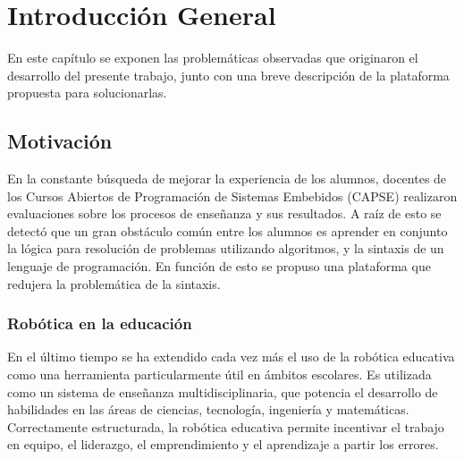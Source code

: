 
\chapter{Introducción General} %

\label{Chapter1} %
\label{IntroGeneral}

\newcommand{\keyword}[1]{\textbf{#1}}
\newcommand{\tabhead}[1]{\textbf{#1}}
\newcommand{\code}[1]{\texttt{#1}}
\newcommand{\file}[1]{\texttt{\bfseries#1}}
\newcommand{\option}[1]{\texttt{\itshape#1}}
\newcommand{\grados}{$^{\circ}$}



En este capítulo se exponen las problemáticas observadas que originaron el desarrollo del presente trabajo, junto con una breve descripción de la plataforma propuesta para solucionarlas.
\section{Motivación}
\label{sec:motivacion}
En la constante búsqueda de mejorar la experiencia de los alumnos, docentes de los Cursos Abiertos de Programación de Sistemas Embebidos (CAPSE) realizaron evaluaciones sobre los procesos de enseñanza y sus resultados. A raíz de esto se detectó que un gran obstáculo común entre los alumnos es aprender en conjunto la lógica para resolución de problemas utilizando algoritmos, y la sintaxis de un lenguaje de programación. En función de esto se propuso una plataforma que redujera la problemática de la sintaxis.
\subsection{Robótica en la educación}
En el último tiempo se ha extendido cada vez más el uso de la robótica educativa como una herramienta particularmente útil en ámbitos escolares. Es utilizada como un sistema de enseñanza multidisciplinaria, que potencia el desarrollo de habilidades en las áreas de ciencias, tecnología, ingeniería y matemáticas. Correctamente estructurada, la robótica educativa permite incentivar el trabajo en equipo, el liderazgo, el emprendimiento y el aprendizaje a partir los errores.

